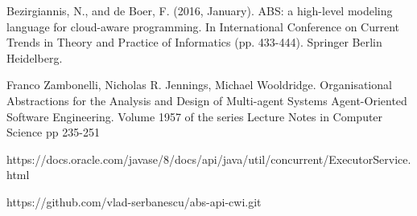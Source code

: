 \documentclass[runningheads,a4paper]{llncs}
\begin{document}
\begin{thebibliography}{4}
		 Bezirgiannis, N., and de Boer, F. (2016, January). ABS: a high-level modeling language for cloud-aware programming. In International Conference on Current Trends in Theory and Practice of Informatics (pp. 433-444). Springer Berlin Heidelberg.
		
		Franco Zambonelli, Nicholas R. Jennings, Michael Wooldridge. 
		Organisational Abstractions for the Analysis and Design of Multi-agent Systems
		Agent-Oriented Software Engineering. Volume 1957 of the series Lecture Notes in Computer Science pp 235-251
		
		 https://docs.oracle.com/javase/8/docs/api/java/util/concurrent/ExecutorService.html
		
		https://github.com/vlad-serbanescu/abs-api-cwi.git
	\end{thebibliography}
	
	
	
\end{document}
